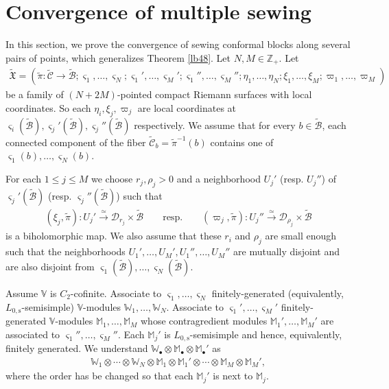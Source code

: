 \documentclass[12pt,a4paper,notitlepage]{article}
\theoremstyle{definition}
\theoremstyle{plain}
\newcommand{\fk}{\mathfrak}
\newcommand{\mc}{\mathcal}
\newcommand{\wtd}{\widetilde}
\newcommand{\sgm}{\varsigma}
\newcommand{\blt}{\bullet}
\newcommand{\Vbb}{\mathbb V}
\newcommand{\Wbb}{\mathbb W}
\newcommand{\Mbb}{\mathbb M}
\newcommand{\Zbb}{\mathbb Z}
\newcommand{\Lss}{L_{0,\mathrm{s}}}
\numberwithin{equation}{section}
\begin{document}
\section{Convergence of multiple sewing}\label{lb56}


In this section, we prove the convergence of sewing conformal blocks along several pairs of points, which generalizes Theorem \ref{lb48}. Let $N,M\in\Zbb_+$. Let
\begin{align*}
\wtd{\fk X}=(\wtd\pi:\wtd{\mc C}\rightarrow\wtd{\mc B};\sgm_1,\dots,\sgm_N;\sgm_1',\dots,\sgm_M';\sgm_1'',\dots,\sgm_M'';\eta_1,\dots,\eta_N;\xi_1,\dots,\xi_M;\varpi_1,\dots,\varpi_M)
\end{align*}
be a family of $(N+2M)$-pointed compact Riemann surfaces with local coordinates. So each $\eta_i,\xi_j,\varpi_j$ are local coordinates at $\sgm_i(\wtd{\mc B}),\sgm_j'(\wtd{\mc B}),\sgm_j''(\wtd{\mc B})$ respectively. We assume that for every $b\in\wtd{\mc B}$, each connected component of the fiber  $\wtd{\mc C}_b=\wtd\pi^{-1}(b)$ contains one of $\sgm_1(b),\dots,\sgm_N(b)$.

For each $1\leq j\leq M$ we choose $r_j,\rho_j>0$ and a neighborhood $U_j'$ (resp. $U_j''$) of $\sgm_j'(\wtd {\mc B})$ (resp. $\sgm_j''(\wtd {\mc B})$) such that
\begin{gather}
(\xi_j,\wtd\pi):U_j'\xrightarrow{\simeq} \mc D_{r_j}\times\wtd{\mc B}\qquad\text{resp.}\qquad (\varpi_j,\wtd\pi):U_j''\xrightarrow{\simeq} \mc D_{\rho_j}\times\wtd{\mc B}\label{eq94}
\end{gather}
is a biholomorphic map. We also assume that these $r_i$ and $\rho_j$ are small enough such that the neighborhoods $U_1',\dots,U_M',U_1'',\dots,U_M''$ are mutually disjoint and are also disjoint from $\sgm_1(\wtd{\mc B}),\dots,\sgm_N(\wtd{\mc B})$. 




Assume $\Vbb$ is $C_2$-cofinite. Associate to $\sgm_1,\dots,\sgm_N$ finitely-generated (equivalently, $\Lss$-semisimple) $\Vbb$-modules $\Wbb_1,\dots,\Wbb_N$. Associate to $\sgm_1',\dots,\sgm_M'$ finitely-generated  $\Vbb$-modules $\Mbb_1,\dots,\Mbb_M$ whose contragredient modules $\Mbb_1',\dots,\Mbb_M'$ are associated to $\sgm_1'',\dots,\sgm_M''$. Each $\Mbb_j'$ is $\Lss$-semisimple and hence, equivalently, finitely generated.  We understand $\Wbb_\blt\otimes\Mbb_\blt\otimes\Mbb_\blt'$ as
\begin{align*}
\Wbb_1\otimes\cdots\otimes \Wbb_N\otimes\Mbb_1\otimes\Mbb_1'\otimes\cdots\otimes\Mbb_M\otimes\Mbb_M',
\end{align*}
where the order has be changed so that each $\Mbb_j'$ is next to $\Mbb_j$. 
\end{document}
